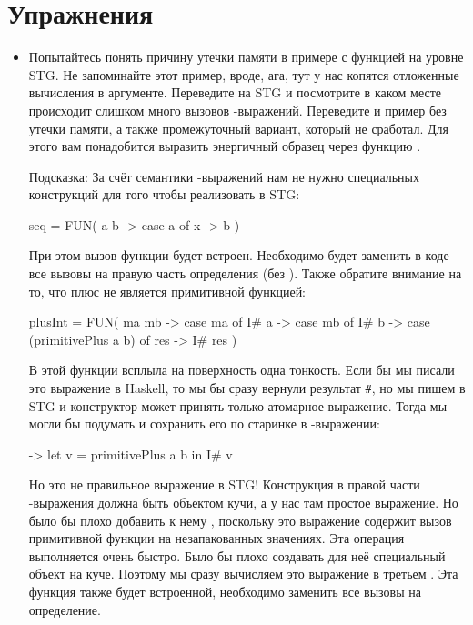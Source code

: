     
\section{Упражнения}

\begin{itemize}

\item Попытайтесь понять причину утечки памяти в примере с
функцией  на уровне STG. Не запоминайте этот пример,
вроде, ага, тут у нас копятся отложенные вычисления в аргументе.
Переведите на STG и посмотрите в каком месте происходит слишком
много вызовов -выражений. Переведите и пример без
утечки памяти, а также промежуточный вариант, который не сработал.
Для этого вам понадобится выразить энергичный образец через
функцию . 

Подсказка: За счёт семантики -выражений
нам не нужно специальных конструкций для
того чтобы реализовать  в STG:

\begin{code}
seq = FUN( a b ->
        case a of
            x -> b
      )
\end{code}
  
При этом вызов функции  будет встроен. Необходимо
будет заменить в коде все вызовы  на правую часть определения
(без ). Также обратите внимание на то, что плюс не
является примитивной функцией:


\begin{code}
plusInt = FUN( ma mb ->
            case ma of
                I# a -> case mb of
                            I# b -> case (primitivePlus a b) of
                                        res -> I# res
          )
\end{code}

В этой функции всплыла на поверхность одна тонкость. 
Если бы мы писали это выражение в Haskell, то мы бы сразу
вернули результат \verb!#!, но
мы пишем в STG и конструктор может принять только атомарное выражение.
Тогда мы могли бы подумать и сохранить его по старинке в 
-выражении:

\begin{code}
-> let v = primitivePlus a b
   in  I# v 
\end{code}
  
Но это не правильное выражение в STG! Конструкция в правой части
-выражения должна быть объектом кучи, а у нас там простое
выражение. Но было бы плохо добавить к нему ,
поскольку это выражение содержит вызов примитивной функции
на незапакованных значениях. Эта операция выполняется очень быстро.
Было бы плохо создавать для неё специальный объект
на куче. Поэтому мы сразу вычисляем это выражение в третьем .
Эта функция также будет встроенной, необходимо заменить все
вызовы на определение. 


\end{itemize}
